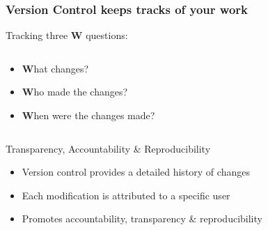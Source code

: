 \documentclass[xcolor=x11names,compress, aspectratio=169]{beamer}
\renewcommand{\(}{\begin{columns}}
\renewcommand{\)}{\end{columns}}
\newcommand{\<}[1]{\begin{column}{#1}}
\renewcommand{\>}{\end{column}}
\begin{document}
\begin{frame} %
\frametitle{Version Control keeps tracks of your work}
Tracking three \textbf{W} questions:
\begin{columns}[t]
 \begin{column}{0.5\textwidth}
 \begin{itemize}[<+->]
 \item[] \textcolor{siap}{\textbf{W}}hat changes?
 \item[] \textcolor{siap}{\textbf{W}}ho made the changes?
 \item[] \textcolor{siap}{\textbf{W}}hen were the changes made?
 \end{itemize}
 \end{column}
  \begin{column}{0.5\textwidth}
    \begin{center}
    \begin{itemize}
    \end{itemize}
    \end{center}
  \end{column}
\end{columns}
\end{frame}



\begin{frame}{Transparency, Accountability \& Reproducibility}
    \begin{itemize}[<+->]
        \item Version control provides a detailed history of changes
        \item Each modification is attributed to a specific user
        \item Promotes accountability, transparency \&  reproducibility
    \end{itemize}
\end{frame}
\end{document}
